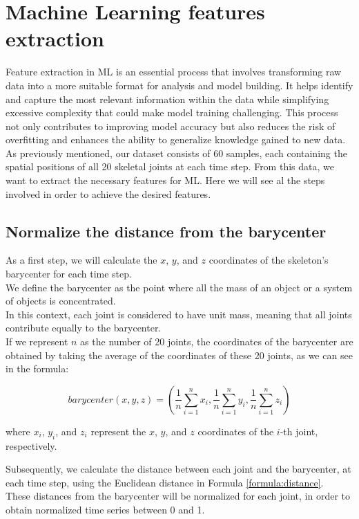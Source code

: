 \section{Machine Learning features extraction}
Feature extraction in ML is an essential process that involves transforming raw data into a more suitable format for analysis and model building.
It helps identify and capture the most relevant information within the data while simplifying excessive complexity that could make model training challenging.
This process not only contributes to improving model accuracy but also reduces the risk of overfitting and enhances the ability to generalize knowledge gained to new data. \\
As previously mentioned, our dataset consists of 60 samples, each containing the spatial positions of all 20 skeletal joints at each time step.
From this data, we want to extract the necessary features for ML.
Here we will see al the steps involved in order to achieve the desired features.

\subsection{Normalize the distance from the barycenter}
As a first step, we will calculate the $x$, $y$, and $z$ coordinates of the skeleton's barycenter for each time step. \\
We define the barycenter as the point where all the mass of an object or a system of objects is concentrated. \\
In this context, each joint is considered to have unit mass, meaning that all joints contribute equally to the barycenter. \\
If we represent $n$ as the number of 20 joints, the coordinates of the barycenter are obtained by taking the average of the coordinates of these 20 joints, as we can see in the formula:


\begin{equation}
    \textit{barycenter} (x, y, z) = \left(\frac{1}{n} \sum_{i=1}^{n} x_i, \frac{1}{n} \sum_{i=1}^{n} y_i, \frac{1}{n} \sum_{i=1}^{n} z_i\right)
    \label{formula:baricentro}
\end{equation}
    
where $x_i$, $y_i$, and $z_i$ represent the $x$, $y$, and $z$ coordinates of the $i$-th joint, respectively.

Subsequently, we calculate the distance between each joint and the barycenter, at each time step, using the Euclidean distance in Formula \ref{formula:distance}. \\
These distances from the barycenter will be normalized for each joint, in order to obtain normalized time series between 0 and 1.

